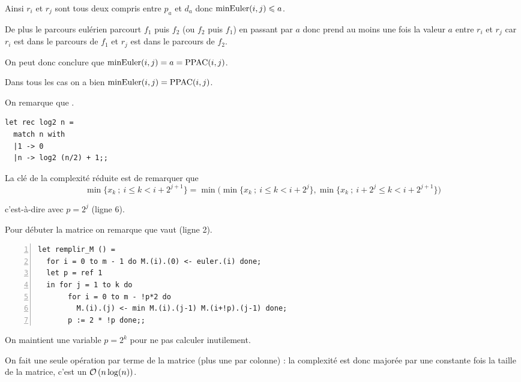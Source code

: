 \begin{Exercise}
\begin{itemize}
Ainsi $r_i$ et $r_j$ sont tous deux compris entre $p_a$ et $d_a$ donc $\hbox{minEuler}(i,j) \le a$.

De plus le parcours eulérien parcourt $f_1$ puis $f_2$ (ou $f_2$ puis $f_1$) en passant par $a$ donc  prend au moins une fois la valeur $a$ entre $r_i$ et $r_j$ car $r_i$ est dans le parcours de $f_1$ et $r_j$ est dans le parcours de $f_2$.

On peut donc conclure que  $\hbox{minEuler}(i,j) = a =\hbox{PPAC}(i,j)$.
\end{itemize}

Dans tous les cas on a bien $\hbox{minEuler}(i,j) =\hbox{PPAC}(i,j)$.
\end{Exercise}
\begin{Exercise} 
On remarque que .
\begin{lstlisting}
let rec log2 n = 
  match n with
  |1 -> 0
  |n -> log2 (n/2) + 1;;
\end{lstlisting}
\end{Exercise}
\newpage
\begin{Exercise} 
La clé de la complexité réduite est de remarquer que
\[\min\bigl\{x_k\ ;\ i\le k < i + 2^{j+1}\bigr\} = \min\biggl(\min\bigl\{x_k\ ;\ i\le k < i + 2^j\bigr\},
\min\bigl\{x_k\ ;\ i + 2^j\le k < i + 2^{j+1}\bigr\}\biggr)\]

c'est-à-dire  avec $p = 2^j$ (ligne 6).

Pour débuter la matrice on remarque que  vaut  (ligne 2).

\begin{lstlisting}[numbers=left]
let remplir_M () =
  for i = 0 to m - 1 do M.(i).(0) <- euler.(i) done;
  let p = ref 1 
  in for j = 1 to k do 
       for i = 0 to m - !p*2 do
         M.(i).(j) <- min M.(i).(j-1) M.(i+!p).(j-1) done;
       p := 2 * !p done;;
\end{lstlisting}

On maintient une variable $p = 2^k$ pour ne pas calculer inutilement.

On fait une seule opération par terme de la matrice (plus une par colonne) : la complexité est donc majorée par une constante fois la taille de la matrice, c'est un $\O{n\log(n)}$.
\end{Exercise}
